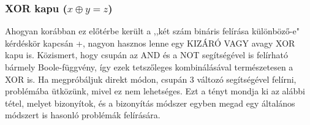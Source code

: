 \subsubsection{XOR kapu ($x \oplus y = z$)} \label{sec:XORgate}

Ahogyan korábban ez előtérbe került a ,,két szám bináris felírása különböző-e" kérdéskör kapcsán \az+, nagyon hasznos lenne egy KIZÁRÓ VAGY avagy XOR kapu is. Közismert, hogy csupán az AND és a NOT segítségével is felírható bármely Boole-függvény, így ezek tetszőleges kombinálásával természetesen a XOR is.
Ha megpróbáljuk direkt módon, csupán 3 változó segítségével felírni, problémába ütközünk, mivel ez nem lehetséges. Ezt a tényt mondja ki az alábbi tétel, melyet bizonyítok, és a bizonyítás módszer egyben megad egy általános módszert is hasonló problémák felírására.

